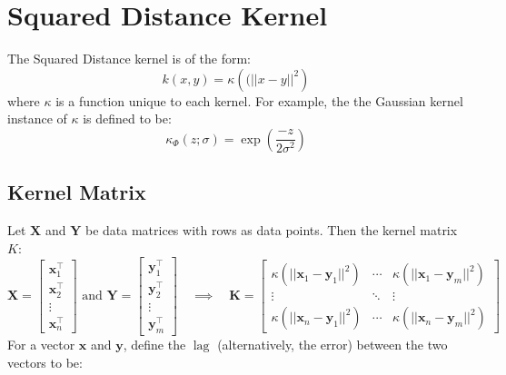 \documentclass[12pt, a4paper]{article}
\DeclareMathOperator{\lag}{lag}
\begin{document}
\section{Squared Distance Kernel}
The Squared Distance kernel is of the form:
\begin{equation*}
    k(x,y) = \kappa\left((||x - y||^2\right)
\end{equation*}
where $\kappa$ is a function unique to each kernel.  For example, the the Gaussian kernel instance of $\kappa$ is defined to be:
\begin{equation*}
    \kappa_{\Phi}(z;\sigma) = \exp\left(\frac{-z}{2\sigma^2}\right)
\end{equation*}

\subsection{Kernel Matrix}
Let $\mathbf{X}$ and $\mathbf{Y}$ be data matrices with rows as data points. Then the kernel matrix $K$:
\begin{equation*}
    \mathbf{X} = \left[
        \begin{array}{c}
            \mathbf{x}_1^{\intercal} \\
            \mathbf{x}_2^{\intercal} \\
            \vdots \\
            \mathbf{x}_n^{\intercal}
        \end{array} 
    \right]
    \text{ and }
    \mathbf{Y} = \left[
        \begin{array}{c}
            \mathbf{y}_1^{\intercal} \\
            \mathbf{y}_2^{\intercal} \\
            \vdots \\
            \mathbf{y}_m^{\intercal}
        \end{array} 
    \right]
    \quad \implies \quad
    \mathbf{K} = \left[
        \begin{array}{ccc}
            \kappa\left(||\mathbf{x}_1 - \mathbf{y}_1||^2\right) & \cdots & \kappa\left(||\mathbf{x}_1 - \mathbf{y}_m||^2\right) \\
            \vdots & \ddots & \vdots \\
            \kappa\left(||\mathbf{x}_n - \mathbf{y}_1||^2\right) & \cdots & \kappa\left(||\mathbf{x}_n - \mathbf{y}_m||^2\right)
        \end{array} 
    \right]
\end{equation*}
For a vector $\mathbf{x}$ and $\mathbf{y}$, define the $\lag$ (alternatively, the error) between the two vectors to be:
\end{document}
